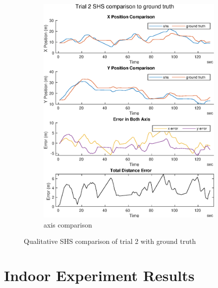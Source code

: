 \begin{figure}[H]
\begin{subfigure}[t]{.45\textwidth}
		\includegraphics[width=\linewidth]{images/20201029_1042_trial2_shs_2}
		\caption{axis comparison}
		\label{fig:trial2_comparison}
	\end{subfigure}
	\setlength{\belowcaptionskip}{-20pt}
	\caption{Qualitative SHS comparison of trial 2 with ground truth}
	\label{fig:trial2_shs_gt_comparison}
\end{figure}


\chapter{Indoor Experiment Results}

